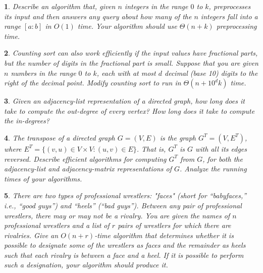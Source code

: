 \documentclass[%
addpoints]{exam}
\theoremstyle{problem}
\newtheorem{p}{}
\begin{document}

\begin{p} 
Describe an algorithm that, given \( n \) integers in the range \( 0 \) to \( k \), preprocesses its input and then answers any query about how many of the \( n \) integers fall into a range \([a:b]\) in \( O(1) \) time. Your algorithm should use \( \Theta(n + k) \) preprocessing time.  
\hfill  
\end{p}

\begin{p} 
Counting sort can also work efficiently if the input values have fractional parts, but the number of digits in the fractional part is small. Suppose that you are given \( n \) numbers in the range \( 0 \) to \( k \), each with at most \( d \) decimal (base 10) digits to the right of the decimal point. Modify counting sort to run in \( \Theta(n + 10^d k) \) time.  
\hfill  
\end{p}

\begin{p} 
Given an adjacency-list representation of a directed graph, how long does it take to compute the out-degree of every vertex? How long does it take to compute the in-degrees?  
\hfill  
\end{p}

\begin{p} 
The \textit{transpose} of a directed graph \( G = (V, E) \) is the graph \( G^T = (V, E^T) \), where \( E^T = \{(v, u) \in V \times V : (u, v) \in E\} \). That is, \( G^T \) is \( G \) with all its edges reversed.  
Describe efficient algorithms for computing \( G^T \) from \( G \), for both the adjacency-list and adjacency-matrix representations of \( G \). Analyze the running times of your algorithms.  
\hfill  
\end{p}

\begin{p} 
There are two types of professional wrestlers: "faces" (short for “babyfaces,” i.e., “good guys”) and “heels” (“bad guys”). Between any pair of professional wrestlers, there may or may not be a rivalry. You are given the names of \( n \) professional wrestlers and a list of \( r \) pairs of wrestlers for which there are rivalries. Give an \( O(n + r) \)-time algorithm that determines whether it is possible to designate some of the wrestlers as faces and the remainder as heels such that each rivalry is between a face and a heel. If it is possible to perform such a designation, your algorithm should produce it.  
\hfill  
\end{p}
\end{document}
